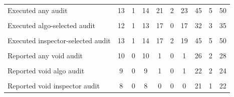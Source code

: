 {\begin{tabular}{l*{9}{c}}
Executed any audit&          13         &           1         &          14         &          21         &           2         &          23         &          45         &           5         &          50         \\
            &                     &                     &                     &                     &                     &                     &                     &                     &                     \\
Executed algo-selected audit&          12         &           1         &          13         &          17         &           0         &          17         &          32         &           3         &          35         \\
            &                     &                     &                     &                     &                     &                     &                     &                     &                     \\
Executed inspector-selected audit&          13         &           1         &          14         &          17         &           2         &          19         &          45         &           5         &          50         \\
            &                     &                     &                     &                     &                     &                     &                     &                     &                     \\
Reported any void audit&          10         &           0         &          10         &           1         &           0         &           1         &          26         &           2         &          28         \\
            &                     &                     &                     &                     &                     &                     &                     &                     &                     \\
Reported void algo audit&           9         &           0         &           9         &           1         &           0         &           1         &          22         &           2         &          24         \\
            &                     &                     &                     &                     &                     &                     &                     &                     &                     \\
Reported void inspector audit&           8         &           0         &           8         &           0         &           0         &           0         &          21         &           1         &          22         \\

\end{tabular}}
